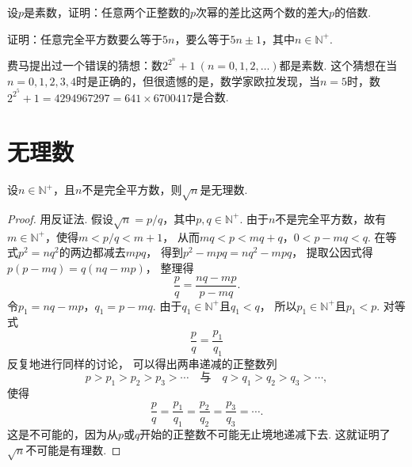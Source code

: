\begin{example}
设\(p\)是素数，证明：任意两个正整数的\(p\)次幂的差比这两个数的差大\(p\)的倍数.
\end{example}

\begin{example}
证明：任意完全平方数要么等于\(5n\)，要么等于\(5n\pm1\)，其中\(n\in\mathbb{N}^+\).
\end{example}

\begin{example}[费马猜想]
费马提出过一个错误的猜想：数\(2^{2^n}+1\ (n=0,1,2,\dotsc)\)都是素数.
这个猜想在当\(n=0,1,2,3,4\)时是正确的，但很遗憾的是，数学家欧拉发现，当\(n=5\)时，数\(2^{2^5}+1 = 4294967297 = 641 \times 6700417\)是合数.
\end{example}

\section{无理数}
\begin{proposition}
设\(n\in\mathbb{N}^+\)，且\(n\)不是完全平方数，则\(\sqrt{n}\)是无理数.
\begin{proof}
用反证法.
假设\(\sqrt{n} = p/q\)，其中\(p,q\in\mathbb{N}^+\).
由于\(n\)不是完全平方数，故有\(m\in\mathbb{N}^+\)，使得\(m<p/q<m+1\)，
从而\(mq<p<mq+q\)，\(0<p-mq<q\).
在等式\(p^2=nq^2\)的两边都减去\(mpq\)，
得到\(p^2-mpq=nq^2-mpq\)，
提取公因式得\(p(p-mq)=q(nq-mp)\)，
整理得\[
	\frac{p}{q} = \frac{nq-mp}{p-mq}.
\]
令\(p_1=nq-mp\)，\(q_1=p-mq\).
由于\(q_1\in\mathbb{N}^+\)且\(q_1<q\)，
所以\(p_1\in\mathbb{N}^+\)且\(p_1<p\).
对等式\[
	\frac{p}{q} = \frac{p_1}{q_1}
\]反复地进行同样的讨论，
可以得出两串递减的正整数列\[
	p>p_1>p_2>p_3>\dotsb
	\quad\text{与}\quad
	q>q_1>q_2>q_3>\dotsb,
\]
使得\[
	\frac{p}{q}=\frac{p_1}{q_1}=\frac{p_2}{q_2}=\frac{p_3}{q_3}=\dotsb.
\]
这是不可能的，因为从\(p\)或\(q\)开始的正整数不可能无止境地递减下去.
这就证明了\(\sqrt{n}\)不可能是有理数.
\end{proof}
\end{proposition}
\endgroup
